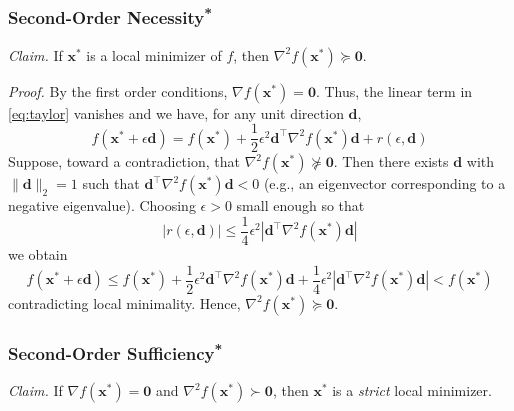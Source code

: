 \subsubsection{\texorpdfstring{Second-Order Necessity\textsuperscript{*}}{Second-Order Necessity}}
\emph{Claim.} If $\mathbf{x}^*$ is a local minimizer of $f$, then $\nabla^2 f(\mathbf{x}^*) \succeq \mathbf{0}$.

\emph{Proof.}
By the first order conditions, $\nabla f(\mathbf{x}^*)=\mathbf{0}$. Thus, the linear term in \autoref{eq:taylor} vanishes and we have, for any unit direction $\mathbf{d}$,
\begin{equation}
f(\mathbf{x}^* + \epsilon \mathbf{d})
= f(\mathbf{x}^*) + \frac{1}{2}\epsilon^2 \mathbf{d}^\top \nabla^2 f(\mathbf{x}^*) \mathbf{d} + r(\epsilon,\mathbf{d})
\end{equation}
Suppose, toward a contradiction, that $\nabla^2 f(\mathbf{x}^*) \nsucceq \mathbf{0}$. Then there exists $\mathbf{d}$ with $\|\mathbf{d}\|_2=1$ such that 
$\mathbf{d}^\top \nabla^2 f(\mathbf{x}^*) \mathbf{d} < 0$ (e.g., an eigenvector corresponding to a negative eigenvalue). Choosing $\epsilon>0$ small enough so that
\begin{equation}
|r(\epsilon,\mathbf{d})|\le \frac{1}{4}\epsilon^2  \left|\mathbf{d}^\top \nabla^2 f(\mathbf{x}^*) \mathbf{d}\right|
\end{equation} 
we obtain
\begin{equation}
f(\mathbf{x}^* + \epsilon \mathbf{d}) 
\le f(\mathbf{x}^*) + \frac{1}{2}\epsilon^2 \mathbf{d}^\top \nabla^2 f(\mathbf{x}^*) \mathbf{d} 
+ \frac{1}{4}\epsilon^2 \left|\mathbf{d}^\top \nabla^2 f(\mathbf{x}^*) \mathbf{d}\right|
< f(\mathbf{x}^*)
\end{equation}
contradicting local minimality. Hence, $\nabla^2 f(\mathbf{x}^*) \succeq \mathbf{0}$.

\subsubsection{\texorpdfstring{Second-Order Sufficiency\textsuperscript{*}}{Second-Order Sufficiency}}
\emph{Claim.} If $\nabla f(\mathbf{x}^*)=\mathbf{0}$ and $\nabla^2 f(\mathbf{x}^*) \succ \mathbf{0}$, then $\mathbf{x}^*$ is a \emph{strict} local minimizer.

